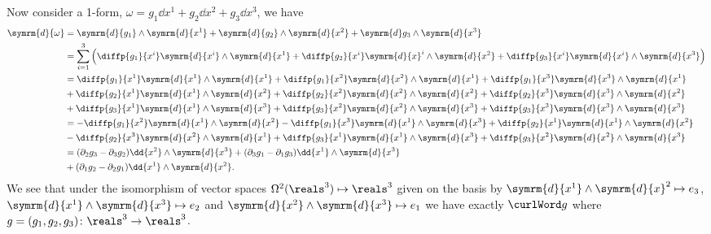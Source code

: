 \documentclass[fleqn]{NotesClass}
\renewcommand{\dl}{\symrm{d}}
\begin{document}
    Now consider a 1-form, \(\omega = g_1 \dd{x^1} + g_2 \dd{x^2} + g_3 \dd{x^3}\), we have
    \begin{align}
        \dl{\omega} &= \dl{g_1} \wedge \dl{x^1} + \dl{g_2} \wedge \dl{x^2} + \dl g_3 \wedge \dl{x^3}\\
        &= \sum_{i=1}^3 \left( \diffp{g_1}{x^i} \dl{x^i} \wedge \dl{x^1} + \diffp{g_2}{x^i} \dl{x}^i \wedge \dl{x^2} + \diffp{g_3}{x^i} \dl{x^i} \wedge \dl{x^3} \right)\\
        &= \diffp{g_1}{x^1} \dl{x^1} \wedge \dl{x^1} + \diffp{g_1}{x^2} \dl{x^2} \wedge \dl{x^1} + \diffp{g_1}{x^3} \dl{x^3} \wedge \dl{x^1}\\
        &+ \diffp{g_2}{x^1} \dl{x^1} \wedge \dl{x^2} + \diffp{g_2}{x^2} \dl{x^2} \wedge \dl{x^2} + \diffp{g_2}{x^3} \dl{x^3} \wedge \dl{x^2} \notag\\
        &+ \diffp{g_3}{x^1} \dl{x^1} \wedge \dl{x^3} + \diffp{g_3}{x^2} \dl{x^2} \wedge \dl{x^3} + \diffp{g_3}{x^3} \dl{x^3} \wedge \dl{x^3} \notag\\
        &= -\diffp{g_1}{x^2} \dl{x^1} \wedge \dl{x^2} - \diffp{g_1}{x^3} \dl{x^1} \wedge \dl{x^3} + \diffp{g_2}{x^1} \dl{x^1} \wedge \dl{x^2}\\
        &- \diffp{g_2}{x^3} \dl{x^2} \wedge \dl{x^1} + \diffp{g_3}{x^1} \dl{x^1} \wedge \dl{x^3} + \diffp{g_3}{x^2} \dl{x^2} \wedge \dl{x^3} \notag\\
        &= ( \partial_2 g_3 - \partial_3 g_2 ) \dd{x^2} \wedge \dl{x^3} + ( \partial_3 g_1 - \partial_1 g_3 ) \dd{x^1} \wedge \dl{x^3}\\
        &+ ( \partial_1 g_2 - \partial_2 g_1 ) \dd{x^1} \wedge \dl{x^2}. \notag
    \end{align}
    We see that under the isomorphism of vector spaces \(\Omega^2(\reals^3) \mapsto \reals^3\) given on the basis by \(\dl{x^1} \wedge \dl{x}^2 \mapsto e_3\), \(\dl{x^1} \wedge \dl{x^3} \mapsto e_2\) and \(\dl{x^2} \wedge \dl{x^3} \mapsto e_1\) we have exactly \(\curlWord g\) where \(g = (g_1, g_2, g_3) \colon \reals^3 \to \reals^3\).
    
\end{document}
